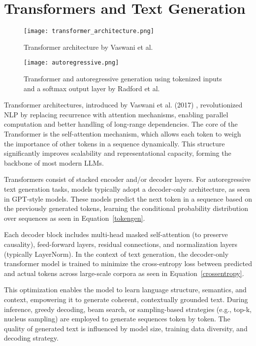\section{Transformers and Text Generation}

\begin{figure}[t]
  \centering
  \texttt{[image: transformer\_architecture.png]}
  \caption{Transformer architecture by Vaswani et al. \cite{vaswani2017attention}}
\end{figure}

\begin{figure}[t]
  \centering
  \texttt{[image: autoregressive.png]}
  \caption{Transformer and autoregressive generation using tokenized inputs and a softmax output layer by Radford et al. \cite{radford2018improving}}
\end{figure}

Transformer architectures, introduced by Vaswani et al. (2017) \cite{vaswani2017attention}, revolutionized NLP by
replacing recurrence with attention mechanisms, enabling parallel computation and better
handling of long-range dependencies. The core of the Transformer is the self-attention
mechanism, which allows each token to weigh the importance of other tokens in a sequence
dynamically. This structure significantly improves scalability and representational capacity,
forming the backbone of most modern LLMs.

Transformers consist of stacked encoder and/or decoder layers. For autoregressive text
generation tasks, models typically adopt a decoder-only architecture, as seen in GPT-style
models. These models predict the next token in a sequence based on the previously
generated tokens, learning the conditional probability distribution over sequences as seen
in Equation~\ref{tokengen}.

Each decoder block includes multi-head masked self-attention (to preserve causality),
feed-forward layers, residual connections, and normalization layers (typically LayerNorm).
In the context of text generation, the decoder-only transformer model is trained to minimize
the cross-entropy loss between predicted and actual tokens across large-scale corpora
as seen in Equation~\ref{crossentropy}.

This optimization enables the model to learn language structure, semantics, and context,
empowering it to generate coherent, contextually grounded text. During inference,
greedy decoding, beam search, or sampling-based strategies (e.g., top-k, nucleus sampling)
are employed to generate sequences token by token. The quality of generated text
is influenced by model size, training data diversity, and decoding strategy.

